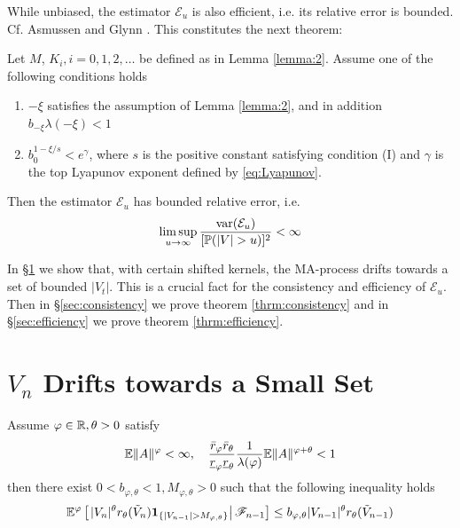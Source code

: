 \documentclass[aoas,preprint]{imsart}
\numberwithin{equation}{section}
\theoremstyle{plain}
\begin{document}
While unbiased, the estimator $\mathcal E_u$ is also efficient,
i.e. its relative error is bounded. Cf. Asmussen and Glynn
\cite{opac-b1123521}. This constitutes the next theorem:
\begin{theorem}
  \label{thrm:efficiency}
  Let $M$, $K_i, i=0, 1, 2, \dots$ be defined as in Lemma
  \ref{lemma:2}. Assume one of the following conditions holds
  \begin{enumerate}[1)]
    \item $-\xi$ satisfies the assumption of Lemma \ref{lemma:2}, and in
      addition $b_{-\xi} \lambda(-\xi) < 1$
    \item $b_0^{1- \xi/s} < e^\gamma$, where $s$ is the positive constant
    satisfying condition (I) and $\gamma$ is the top Lyapunov exponent
    defined by \eqref{eq:Lyapunov}.
  \end{enumerate}
  Then the estimator $\mathcal E_u$ has bounded relative error, i.e.
  \begin{equation*}
    \limsup_{u \to \infty} {\text{var}(\mathcal E_u) \over [\mathbb{P}(|V| > u)]^2} < \infty
  \end{equation*}
\end{theorem}
In \S\ref{sec:drift} we show that, with certain shifted kernels, the
MA-process drifts towards a set of bounded $|V_t|$. This is a crucial
fact for the consistency and efficiency of $\mathcal E_u$.
Then in \S\ref{sec:consistency} we prove theorem
\ref{thrm:consistency} and in \S\ref{sec:efficiency} we prove theorem
\ref{thrm:efficiency}.

\section[The Chain Drifts towards a Small Set]{$V_n$ Drifts towards a Small Set}
\label{sec:drift}
\begin{lemma}
  \label{lemma:1}
  Assume $\varphi \in \mathbb R, \theta > 0$ satisfy
  \begin{equation}
    \label{eq:drift_cond}
    \mathbb{E} \|A\|^\varphi < \infty,\quad
       {
         \bar r_\varphi  \bar r_\theta
         \over
         \underline r_\varphi \underline r_\theta
       } {1 \over \lambda(\varphi)}
       \mathbb{E} \| A \|^{\varphi + \theta}
       < 1
  \end{equation}
  then there exist
  $0 < b_{\varphi, \theta} < 1, M_{\varphi, \theta} > 0$
  such that the following inequality holds
  \begin{equation}
    \label{eq:drift}
    \mathbb{E}^\varphi \left[\left.
      |V_n|^\theta r_\theta(\tilde V_n)
      \mathbf{1}_{\{|V_{n-1}| > M_{\varphi, \theta}\}} \right|
      \mathscr F_{n-1} \right]
    \leq
    b_{\varphi, \theta} |V_{n-1}|^\theta
    r_{\theta}(\tilde V_{n-1})
  \end{equation}
\end{lemma}
\end{document}
